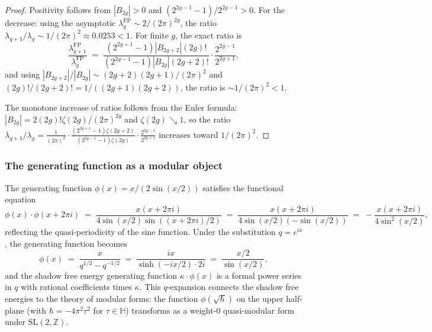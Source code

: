 \begin{proof}
Positivity follows from $|B_{2g}| > 0$ and $(2^{2g-1}-1)/2^{2g-1} > 0$. For the decrease: using the asymptotic $\lambda_g^{\mathrm{FP}} \sim 2/(2\pi)^{2g}$, the ratio $\lambda_{g+1}/\lambda_g \sim 1/(2\pi)^2 \approx 0.0253 < 1$. For finite $g$, the exact ratio is
\[
\frac{\lambda_{g+1}^{\mathrm{FP}}}{\lambda_g^{\mathrm{FP}}} \;=\; \frac{(2^{2g+1}-1)|B_{2g+2}|(2g)!}{(2^{2g-1}-1)|B_{2g}|(2g+2)!} \cdot \frac{2^{2g-1}}{2^{2g+1}},
\]
and using $|B_{2g+2}|/|B_{2g}| \sim (2g+2)(2g+1)/(2\pi)^2$ and $(2g)!/(2g+2)! = 1/((2g+1)(2g+2))$, the ratio is $\sim 1/(2\pi)^2 < 1$.

The monotone increase of ratios follows from the Euler formula: $|B_{2g}| = 2(2g)!\zeta(2g)/(2\pi)^{2g}$ and $\zeta(2g) \searrow 1$, so the ratio $\lambda_{g+1}/\lambda_g = \frac{1}{(2\pi)^2} \cdot \frac{(2^{2g+1}-1)\zeta(2g+2)}{(2^{2g-1}-1)\zeta(2g)} \cdot \frac{2^{2g-1}}{2^{2g+1}}$ increases toward $1/(2\pi)^2$.
\end{proof}

\subsubsection{The generating function as a modular object}

\begin{remark}
The generating function $\phi(x) = x/(2\sin(x/2))$ satisfies the functional equation
\begin{equation}%
\phi(x) \cdot \phi(x + 2\pi i) \;=\; \frac{x(x + 2\pi i)}{4\sin(x/2)\sin((x+2\pi i)/2)} \;=\; \frac{x(x + 2\pi i)}{4\sin(x/2)(-\sin(x/2))} \;=\; -\frac{x(x+2\pi i)}{4\sin^2(x/2)},
\end{equation}
reflecting the quasi-periodicity of the sine function. Under the substitution $q = e^{ix}$, the generating function becomes
\begin{equation}%
\phi(x) \;=\; \frac{x}{q^{1/2} - q^{-1/2}} \;=\; \frac{ix}{\sinh(-ix/2) \cdot 2i} \;=\; \frac{x/2}{\sin(x/2)},
\end{equation}
and the shadow free energy generating function $\kappa \cdot \phi(x)$ is a formal power series in $q$ with rational coefficients times $\kappa$. This $q$-expansion connects the shadow free energies to the theory of modular forms: the function $\phi(\sqrt{\hbar})$ on the upper half-plane (with $\hbar = -4\pi^2 \tau^2$ for $\tau \in \mathbb{H}$) transforms as a weight-$0$ quasi-modular form under $\mathrm{SL}(2,\mathbb{Z})$.
\end{remark}

